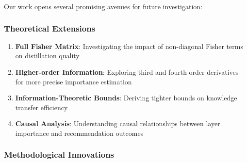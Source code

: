 \documentclass[10pt,conference]{IEEEtran}
\begin{document}
Our work opens several promising avenues for future investigation:

\subsubsection{Theoretical Extensions}

\begin{enumerate}[leftmargin=*]
    \item \textbf{Full Fisher Matrix}: Investigating the impact of non-diagonal Fisher terms on distillation quality
    \item \textbf{Higher-order Information}: Exploring third and fourth-order derivatives for more precise importance estimation
    \item \textbf{Information-Theoretic Bounds}: Deriving tighter bounds on knowledge transfer efficiency
    \item \textbf{Causal Analysis}: Understanding causal relationships between layer importance and recommendation outcomes
\end{enumerate}

\subsubsection{Methodological Innovations}
\end{document}
